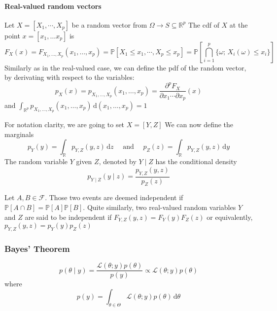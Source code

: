 \documentclass[a4paper,11pt]{article}
\newcommand{\Prob}{\mathbb{P}}
\theoremstyle{defi}
\numberwithin{thmCounter}{section}
\begin{document}
\paragraph{Real-valued random vectors}


\begin{definition}
  \label{def:joint_marginal_cond_densities}
  Let $X=[X_1,\cdots,X_p]$ be a random vector from $\Omega \rightarrow S\subseteq\mathbb{R}^p$
  The cdf of $X$ at the point $x=[x_1,\dots x_p]$ is
  \begin{equation*}
    F_{X}(x) = F_{X_1,\dots, X_p}(x_1,\dots, x_p) = \Prob\left[X_1 \leq x_1, \cdots, X_p\leq x_p\right] = \Prob\left[\bigcap_{i=1}^p \{\omega;\,X_i(\omega) \leq x_i\}\right]
  \end{equation*}
  Similarly as in the real-valued case, we can define the pdf of the random vector, by derivating with respect to the variables:
  \begin{equation*}
    p_{X}(x)= p_{X_1,\dots, X_p}(x_1,\dots, x_p) =\frac{\partial^p F_X}{\partial x_1 \cdots \partial x_p}(x)
  \end{equation*}
  and $\int_{\mathbb{R}^p}p_{X_1,\dots, X_p}(x_1,\dots, x_p)\,\mathrm{d}(x_1,\dots, x_p)=1$

  For notation clarity, we are going to set $X = [Y,Z]$
  We can now define the marginals
  \begin{equation*}
    p_{Y}(y) = \int_{\mathbb{R}}p_{Y,Z}(y,z) \,\mathrm{d}z \quad \text{ and } \quad p_{Z}(z) = \int_{\mathbb{R}}p_{Y,Z}(y,z) \,\mathrm{d}y
  \end{equation*}
  The random variable $Y$ given $Z$, denoted by $Y \mid Z$ has the conditional density
  \begin{equation*}
    p_{Y \mid Z}(y \mid z) = \frac{p_{Y,Z}(y,z)}{p_Z(z)}
  \end{equation*}
\end{definition}
\begin{definition}[Independence]
  Let $A,B\in \mathcal{F}$. Those two events are deemed independent if $\Prob[A \cap B] = \Prob[A]\Prob[B]$.
  Quite similarly, two real-valued random variables $Y$ and $Z$ are said to be independent if $F_{Y,Z}(y,z) = F_Y(y) F_Z(z)$ or equivalently, $p_{Y,Z}(y,z) = p_Y(y) p_Z(z)$
\end{definition}


\subsubsection{Bayes' Theorem}
\label{ssec:bayes_theorem}
\begin{theorem}
  \begin{equation}
  p(\theta \mid y) = \frac{\mathcal{L}(\theta;y)p(\theta)}{p(y)} \propto \mathcal{L}(\theta;y)p(\theta)
  \end{equation}
  where
  \begin{equation}
    p(y) = \int_{\theta \in \Theta} \mathcal{L}(\theta;y)p(\theta)\, \mathrm{d}\theta
  \end{equation}
\end{theorem}
\end{document}
